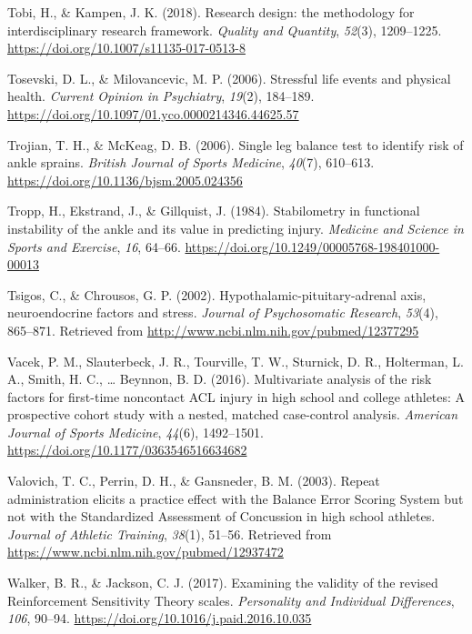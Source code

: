 \documentclass[
  english,
  man,floatsintext]{apa6}
\begin{document}
\leavevmode\hypertarget{ref-Tobi2018a}{}%
Tobi, H., \& Kampen, J. K. (2018). Research design: the methodology for interdisciplinary research framework. \emph{Quality and Quantity}, \emph{52}(3), 1209--1225. \url{https://doi.org/10.1007/s11135-017-0513-8}

\leavevmode\hypertarget{ref-Tosevski2006}{}%
Tosevski, D. L., \& Milovancevic, M. P. (2006). Stressful life events and physical health. \emph{Current Opinion in Psychiatry}, \emph{19}(2), 184--189. \url{https://doi.org/10.1097/01.yco.0000214346.44625.57}

\leavevmode\hypertarget{ref-Trojian2006}{}%
Trojian, T. H., \& McKeag, D. B. (2006). Single leg balance test to identify risk of ankle sprains. \emph{British Journal of Sports Medicine}, \emph{40}(7), 610--613. \url{https://doi.org/10.1136/bjsm.2005.024356}

\leavevmode\hypertarget{ref-Tropp1984}{}%
Tropp, H., Ekstrand, J., \& Gillquist, J. (1984). Stabilometry in functional instability of the ankle and its value in predicting injury. \emph{Medicine and Science in Sports and Exercise}, \emph{16}, 64--66. \url{https://doi.org/10.1249/00005768-198401000-00013}

\leavevmode\hypertarget{ref-Tsigos2002}{}%
Tsigos, C., \& Chrousos, G. P. (2002). Hypothalamic-pituitary-adrenal axis, neuroendocrine factors and stress. \emph{Journal of Psychosomatic Research}, \emph{53}(4), 865--871. Retrieved from \url{http://www.ncbi.nlm.nih.gov/pubmed/12377295}

\leavevmode\hypertarget{ref-Vacek2016}{}%
Vacek, P. M., Slauterbeck, J. R., Tourville, T. W., Sturnick, D. R., Holterman, L. A., Smith, H. C., \ldots{} Beynnon, B. D. (2016). Multivariate analysis of the risk factors for first-time noncontact ACL injury in high school and college athletes: A prospective cohort study with a nested, matched case-control analysis. \emph{American Journal of Sports Medicine}, \emph{44}(6), 1492--1501. \url{https://doi.org/10.1177/0363546516634682}

\leavevmode\hypertarget{ref-Valovich2003}{}%
Valovich, T. C., Perrin, D. H., \& Gansneder, B. M. (2003). Repeat administration elicits a practice effect with the Balance Error Scoring System but not with the Standardized Assessment of Concussion in high school athletes. \emph{Journal of Athletic Training}, \emph{38}(1), 51--56. Retrieved from \url{https://www.ncbi.nlm.nih.gov/pubmed/12937472}

\leavevmode\hypertarget{ref-Walker2017}{}%
Walker, B. R., \& Jackson, C. J. (2017). Examining the validity of the revised Reinforcement Sensitivity Theory scales. \emph{Personality and Individual Differences}, \emph{106}, 90--94. \url{https://doi.org/10.1016/j.paid.2016.10.035}
\end{document}

